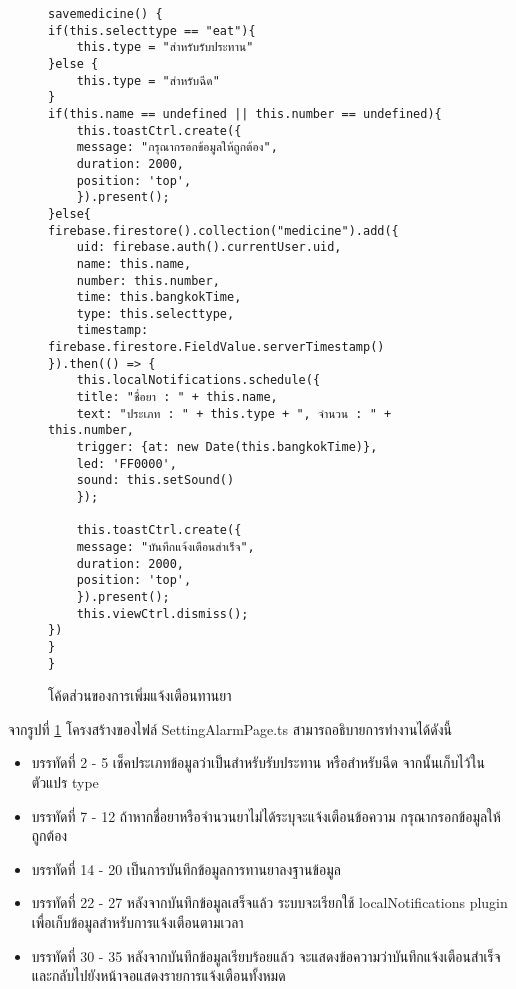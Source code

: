 \begin{figure}[H]
{\lstset{language=Pascal}
\begin{lstlisting}
savemedicine() {
if(this.selecttype == "eat"){
	this.type = "สำหรับรับประทาน"
}else {
	this.type = "สำหรับฉีด"
}
if(this.name == undefined || this.number == undefined){
	this.toastCtrl.create({
	message: "กรุณากรอกข้อมูลให้ถูกต้อง",
	duration: 2000,
	position: 'top',
	}).present();
}else{
firebase.firestore().collection("medicine").add({
	uid: firebase.auth().currentUser.uid,
	name: this.name,
	number: this.number,
	time: this.bangkokTime,
	type: this.selecttype,
	timestamp: firebase.firestore.FieldValue.serverTimestamp()
}).then(() => {
	this.localNotifications.schedule({
	title: "ชื่อยา : " + this.name,
	text: "ประเภท : " + this.type + ", จำนวน : " + this.number,
	trigger: {at: new Date(this.bangkokTime)},
	led: 'FF0000',
	sound: this.setSound()
	});

	this.toastCtrl.create({
	message: "บันทึกแจ้งเตือนสำเร็จ",
	duration: 2000,
	position: 'top',
	}).present();
	this.viewCtrl.dismiss();
})
}
}
\end{lstlisting}}
\caption{โค้ดส่วนของการเพิ่มแจ้งเตือนทานยา}
\label{Fig:4-alarm}
\end{figure}
\newpage

จากรูปที่ \ref{Fig:4-alarm} โครงสร้างของไฟล์ SettingAlarmPage.ts สามารถอธิบายการทำงานได้ดังนี้
\begin{itemize}[label={--}]
\item บรรทัดที่ 2 - 5 เช็คประเภทข้อมูลว่าเป็นสำหรับรับประทาน หรือสำหรับฉีด จากนั้นเก็บไว้ในตัวแปร type
\item บรรทัดที่ 7 - 12 ถ้าหากชื่อยาหรือจำนวนยาไม่ได้ระบุจะแจ้งเตือนข้อความ กรุณากรอกข้อมูลให้ถูกต้อง
\item บรรทัดที่ 14 - 20 เป็นการบันทึกข้อมูลการทานยาลงฐานข้อมูล
\item บรรทัดที่ 22 - 27 หลังจากบันทึกข้อมูลเสร็จแล้ว ระบบจะเรียกใช้ localNotifications plugin เพื่อเก็บข้อมูลสำหรับการแจ้งเตือนตามเวลา
\item บรรทัดที่ 30 - 35 หลังจากบันทึกข้อมูลเรียบร้อยแล้ว จะแสดงข้อความว่าบันทึกแจ้งเตือนสำเร็จ และกลับไปยังหน้าจอแสดงรายการแจ้งเตือนทั้งหมด
\end{itemize}
\newpage


